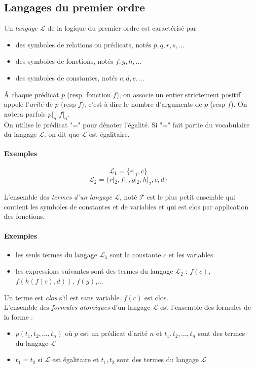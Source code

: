 \documentclass[a4paper]{article}
\begin{document}
  \subsection{Langages du premier ordre}
  Un \textit{langage $\mathcal{L}$} de la logique du premier ordre est caractérisé par
  \begin{itemize}
    \item{des symboles de relations ou prédicats, notés $p, q, r, s, ...$}
    \item{des symboles de fonctions, notés $f, g, h, ...$}
    \item{des symboles de constantes, notés $c, d, e, ...$}
  \end{itemize}
  \'A chaque prédicat $p$ (resp. fonction $f$), on associe un entier strictement
  positif appelé l'\textit{arité} de $p$ (resp $f$), c'est-à-dire le nombre
  d'arguments de $p$ (resp $f$). On notera parfois $p|_n$ $f|_n$.\\

  On utilise le prédicat "=" pour dénoter l'égalité. Si "=" fait partie du 
  vocabulaire du langage $\mathcal{L}$, on dit que $\mathcal{L}$ est égalitaire.

  \paragraph{Exemples} 
  $$\mathcal{L}_1 = \{ r|_1, c \}$$
  $$\mathcal{L}_2 = \{ r|_2, f|_1, g|_2, h|_2, c, d \}$$

  L'ensemble des \textit{termes d'un langage $\mathcal{L}$}, noté $\mathcal{T}$ est le plus petit
  ensemble qui contient les symboles de constantes et de variables et qui est
  clos par application des fonctions.

  \paragraph{Exemples}
  \begin{itemize}
    \item les seuls termes du langage $\mathcal{L}_1$ sont la constante $c$ et les variables
    \item les expressions suivantes sont des termes du langage $\mathcal{L}_2$ : $f(c)$, $f(h(f(c),d))$, $f(y)$,...
  \end{itemize}
  Un terme est \textit{clos} s'il est sans variable. $f(c)$ est clos.\\

  L'ensemble des \textit{formules atomiques} d'un langage $\mathcal{L}$ est l'ensemble
  des formules de la forme :
  \begin{itemize}
    \item $p(t_1, t_2, ..., t_n)$ où $p$ est un prédicat d'arité $n$ et $t_1, t_2, ..., t_n$ 
    sont des termes du langage $\mathcal{L}$
    \item $t_1 = t_2$ si $\mathcal{L}$ est égalitaire et $t_1, t_2$ sont des termes
    du langage $\mathcal{L}$
  \end{itemize}
\end{document}
